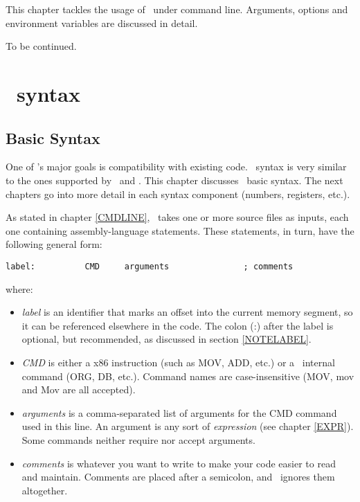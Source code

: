 \documentclass[a4paper,draft,12pt]{book}
\begin{document}
This chapter tackles the usage of \popasm\ under command line. Arguments,
options and environment variables are discussed in detail.

To be continued.

\part{\popasm\ syntax}

\chapter{Basic Syntax}

One of \popasm's major goals is compatibility with existing code.
\popasm\ syntax is very similar to the ones supported by \tasm\ and
\nasm. This chapter discusses \popasm\ basic syntax. The next chapters
go into more detail in each syntax component (numbers, registers, etc.).

As stated in chapter \ref{CMDLINE}, \popasm\ takes one or more source
files as inputs, each one containing assembly-language statements. These
statements, in turn, have the following general form:

\begin{verbatim}
label:          CMD     arguments               ; comments
\end{verbatim}

where:

\begin{itemize}
\item{\emph{label}} is an identifier that marks an offset into the current
   memory segment, so it can be referenced elsewhere in the code. The colon
   (:) after the label is optional, but recommended, as discussed in section
   \ref{NOTELABEL}.
\item{\emph{CMD}} is either a x86 instruction (such as MOV, ADD, etc.) or a
   \popasm\ internal command (ORG, DB, etc.). Command names are
   case-insensitive (MOV, mov and Mov are all accepted).
\item{\emph{arguments}} is a comma-separated list of arguments for the CMD
   command used in this line. An argument is any sort of \emph{expression}
   (see chapter \ref{EXPR}). Some commands neither require nor accept arguments.
\item{\emph{comments}} is whatever you want to write to make your code easier
   to read and maintain. Comments are placed after a semicolon, and
   \popasm\ ignores them altogether.
\end{itemize}
\end{document}
